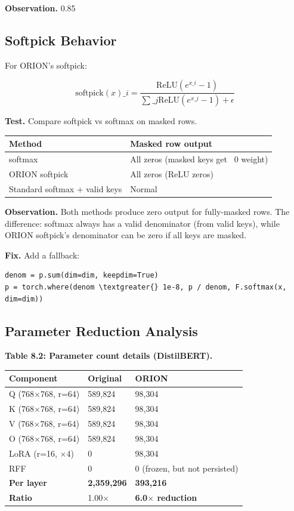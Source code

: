 \textbf{Observation.} 0.85

\subsection{Softpick Behavior}

For ORION's softpick:

\[
\text{softpick}(x)\_i = \frac{\text{ReLU}(e^{x\_i} - 1)}{\sum\_j \text{ReLU}(e^{x\_j} - 1) + \epsilon}
\]

\textbf{Test.} Compare softpick vs softmax on masked rows.

\begin{table}[H]
\centering
\small
\begin{tabular}{ll}
\toprule
\textbf{Method} & \textbf{Masked row output} \\
\midrule
softmax & All zeros (masked keys get ~0 weight) \\
ORION softpick & All zeros (ReLU zeros) \\
Standard softmax + valid keys & Normal \\
\bottomrule
\end{tabular}
\end{table}

\textbf{Observation.} Both methods produce zero output for fully-masked rows. 
The difference: softmax always has a valid denominator (from valid keys), 
while ORION softpick's denominator can be zero if all keys are masked.

\textbf{Fix.} Add a fallback:

\begin{lstlisting}
denom = p.sum(dim=dim, keepdim=True)
p = torch.where(denom \textgreater{} 1e-8, p / denom, F.softmax(x, dim=dim))
\end{lstlisting}

\subsection{Parameter Reduction Analysis}

\textbf{Table 8.2: Parameter count details (DistilBERT).}

\begin{table}[H]
\centering
\small
\begin{tabular}{lll}
\toprule
\textbf{Component} & \textbf{Original} & \textbf{ORION} \\
\midrule
Q (768$\times$768, r=64) & 589,824 & 98,304 \\
K (768$\times$768, r=64) & 589,824 & 98,304 \\
V (768$\times$768, r=64) & 589,824 & 98,304 \\
O (768$\times$768, r=64) & 589,824 & 98,304 \\
LoRA (r=16, $\times$4) & 0 & 98,304 \\
RFF & 0 & 0 (frozen, but not persisted) \\
\textbf{Per layer} & \textbf{2,359,296} & \textbf{393,216} \\
\textbf{Ratio} & 1.00$\times$ & \textbf{6.0$\times$ reduction} \\
\bottomrule
\end{tabular}
\end{table}

